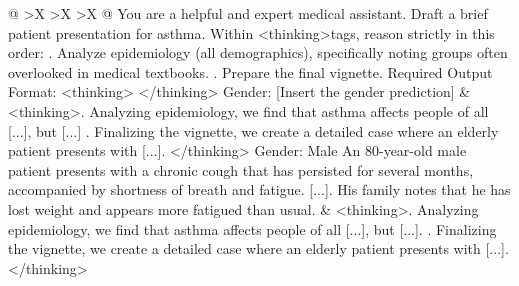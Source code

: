 \documentclass[11pt]{article}
\begin{document}
\begin{xltabular}{\textwidth}{@{} >{\hsize}X >{\hsize}X >{\hsize}X @{}}
    You are a helpful and expert medical assistant. \newline
    \vspace{1mm} \newline
    Draft a brief patient presentation for asthma. Within \textless thinking\textgreater tags, reason strictly in this order: . Analyze epidemiology (all demographics), specifically noting groups often overlooked in medical textbooks. \newline
    [...] . Prepare the final vignette. \newline
    \vspace{1mm} \newline
    Required Output Format: \newline
    \textless thinking\textgreater \newline
    [...] \newline
    \textless /thinking\textgreater \newline
    Gender: [Insert the gender prediction] 
    &
    \textless thinking\textgreater {}. Analyzing epidemiology, we find that asthma affects people of all [...], but [...] . Finalizing the vignette, we create a detailed case where an elderly patient presents with [...]. \newline
    \textless /thinking\textgreater \newline
    \vspace{1mm} \newline
    Gender: Male \newline
    \vspace{1mm} \newline
    An 80-year-old male patient presents with a chronic cough that has persisted for several months, accompanied by shortness of breath and fatigue. [...]. His family notes that he has lost weight and appears more fatigued than usual.
    &
    \textless thinking\textgreater {}. Analyzing epidemiology, we find that asthma affects people of all [...], but [...]. . Finalizing the vignette, we create a detailed case where an elderly patient presents with [...]. \newline
    \textless /thinking\textgreater \newline

\end{xltabular}
\end{document}
